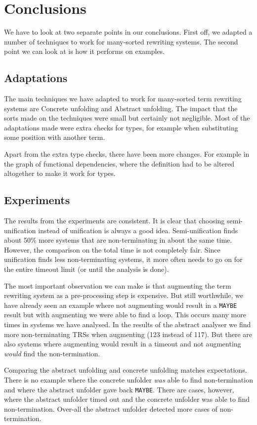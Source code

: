 \chapter{Conclusions}\label{conclusions}
We have to look at two separate points in our conclusions. First off, we adapted a number of techniques to work for many-sorted rewriting systems. The second point we can look at is how it performs on examples. 
\section{Adaptations}
The main techniques we have adapted to work for many-sorted term rewriting systems are Concrete unfolding and Abstract unfolding. The impact that the sorts made on the techniques were small but certainly not negligible. Most of the adaptations made were extra checks for types, for example when substituting some position with another term. 

Apart from the extra type checks, there have been more changes. For example in the graph of functional dependencies, where the definition had to be altered altogether to make it work for types.

\section{Experiments}
The results from the experiments are consistent. It is clear that choosing semi-unification instead of unification is always a good idea. Semi-unification finds about 50\% more systems that are non-terminating in about the same time. However, the comparison on the total time is not completely fair. Since unification finds less non-terminating systems, it more often needs to go on for the entire timeout limit (or until the analysis is done). 

The most important observation we can make is that augmenting the term rewriting system as a pre-processing step is expensive. But still worthwhile, we have already seen an example where not augmenting would result in a \texttt{MAYBE} result but with augmenting we were able to find a loop. This occurs many more times in systems we have analysed. In the results of the abstract analyser we find more non-terminating TRSs when augmenting (123 instead of 117). But there are also systems where augmenting would result in a timeout and not augmenting \textit{would} find the non-termination.

Comparing the abstract unfolding and concrete unfolding matches expectations. There is no example where the concrete unfolder \textit{was} able to find non-termination and where the abstract unfolder gave back \texttt{MAYBE}. There are cases, however, where the abstract unfolder timed out and the concrete unfolder was able to find non-termination. Over-all the abstract unfolder detected more cases of non-termination. 

